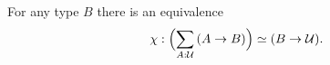 \documentclass[hott-all.tex]{subfiles}
\begin{document}
\begin{thm}\label{thm:nobject-classifier-appetizer}
For any type $B$ there is an equivalence
\begin{equation*}
\chi:\Parens{\sm{A:\type} (A\to B)}\eqvsym (B\to\type).
\end{equation*}
\end{thm}

\end{document}
